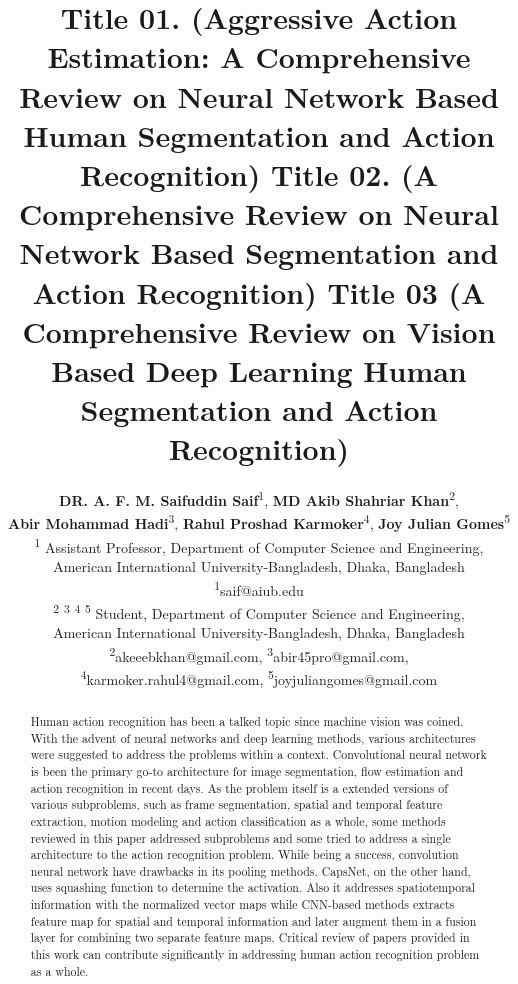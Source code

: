 \documentclass[11pt,english]{article}
\date{}
\newcommand\Mark[1]{\textsuperscript#1}
\begin{document}
\title{Title 01. (Aggressive Action Estimation: A Comprehensive Review on Neural Network Based Human Segmentation and Action Recognition) 
Title 02. (A Comprehensive Review on Neural Network Based Segmentation and Action Recognition) Title 03 (A Comprehensive Review on Vision Based Deep Learning Human Segmentation and Action Recognition)}

\author{\textbf{DR. A. F. M. Saifuddin Saif}\Mark{1}, \textbf{MD Akib Shahriar Khan}\Mark{2}, \\ \textbf{Abir Mohammad Hadi}\Mark{3}, \textbf{Rahul Proshad Karmoker}\Mark{4}, \textbf{Joy Julian Gomes}\Mark{5}\\
\Mark{1} Assistant Professor, Department of Computer Science and Engineering,\\American International University-Bangladesh, Dhaka, Bangladesh\\ \Mark{1}saif@aiub.edu \\
\Mark{2} \Mark{3} \Mark{4} \Mark{5} Student, Department of Computer Science and Engineering,\\American International University-Bangladesh, Dhaka, Bangladesh\\\Mark{2}akeeebkhan@gmail.com, \Mark{3}abir45pro@gmail.com,\\ \Mark{4}karmoker.rahul4@gmail.com, \Mark{5}joyjuliangomes@gmail.com}

\maketitle
\begin{abstract}
Human action recognition has been a talked topic since machine vision was coined. With the advent of neural networks and deep learning methods, various architectures were suggested to address the problems within a context. Convolutional neural network is been the primary go-to architecture for image segmentation, flow estimation and action recognition in recent days. As the problem itself is a extended versions of various subproblems, such as frame segmentation, spatial and temporal feature extraction, motion modeling and action classification as a whole, some methods reviewed in this paper addressed subproblems and some tried to address a single architecture to the action recognition problem. While being a success, convolution neural network have drawbacks in its pooling methods. CapsNet, on the other hand, uses squashing function to determine the activation. Also it addresses spatiotemporal information with the normalized vector maps while CNN-based methods extracts feature map for spatial and temporal information and later augment them in a fusion layer for  combining two separate feature maps. Critical review of papers provided in this work can contribute significantly in addressing human action recognition problem as a whole.
\end{abstract}
\end{document}
